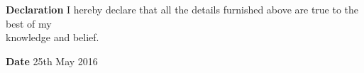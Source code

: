 \documentclass{article}
\begin{document}
	    \begin{flushleft}
	      	\vspace{0.2in}
	      	\textbf{Declaration} \hspace{0.60in}  I hereby declare that all the details furnished above are true to the best of
	      	my\\\hspace{3.7cm} knowledge and belief.
	      \end{flushleft}
	      
	    \begin{flushleft}
	      	\vspace{0.28in}
	      	\textbf{Date} \hspace{1.05 in} 25th May 2016
	      \end{flushleft}
	
\end{document}
